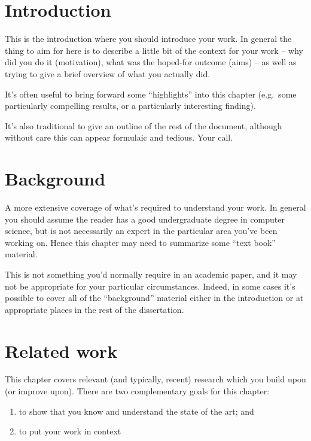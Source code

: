 \documentclass[12pt,a4paper,twoside]{report}
\begin{document}
\fi
\cleardoublepage %

\tableofcontents

\chapter{Introduction}

\label{firstcontentpage} %

This is the introduction where you should introduce your work. In
general the thing to aim for here is to describe a little bit of the
context for your work -- why did you do it (motivation), what was the
hoped-for outcome (aims) -- as well as trying to give a brief overview
of what you actually did.

It's often useful to bring forward some ``highlights'' into this
chapter (e.g.\ some particularly compelling results, or a particularly
interesting finding).

It's also traditional to give an outline of the rest of the document,
although without care this can appear formulaic and tedious. Your
call.

\chapter{Background}

A more extensive coverage of what's required to understand your work.
In general you should assume the reader has a good undergraduate
degree in computer science, but is not necessarily an expert in the
particular area you've been working on. Hence this chapter may need to
summarize some ``text book'' material.

This is not something you'd normally require in an academic paper, and
it may not be appropriate for your particular circumstances. Indeed,
in some cases it's possible to cover all of the ``background''
material either in the introduction or at appropriate places in the
rest of the dissertation.

\chapter{Related work}

This chapter covers relevant (and typically, recent) research
which you build upon (or improve upon). There are two complementary
goals for this chapter:
\begin{enumerate}
  \item to show that you know and understand the state of the art; and
  \item to put your work in context
\end{enumerate}
\end{document}
